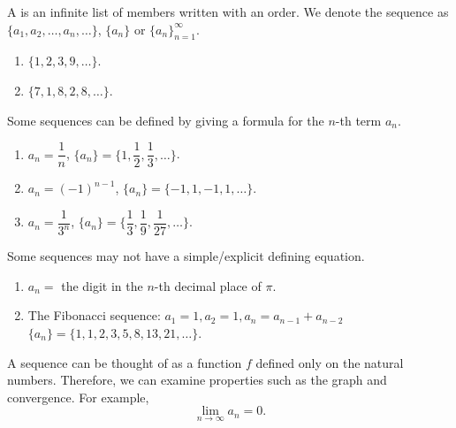 \begin{defn}
     A  is an infinite list of members written with an order. We denote the sequence as $\{a_1, a_2, \ldots, a_n, \ldots\}$, $\{a_n\}$ or $\{a_n\}_{n=1}^\infty$.
\end{defn}

\begin{ex}[sequences]\leavevmode
\begin{enumerate}
    \item $\{1, 2, 3, 9, \ldots\}$.
    \item $\{7, 1, 8, 2, 8, \ldots\}$.
\end{enumerate}
\end{ex}

Some sequences can be defined by giving a formula for the $n$-th term $a_n$.

\begin{ex}\leavevmode
\begin{enumerate}
    \item $a_n = \dfrac{1}{n}$, $\{a_n\} = \{1, \dfrac{1}{2}, \dfrac{1}{3}, \ldots\}$.
    \item $a_n = (-1)^{n-1}$, $\{a_n\} = \{-1, 1, -1, 1, \ldots\}$.
    \item $a_n = \dfrac{1}{3^n}$, $\{a_n\} = \{\dfrac{1}{3}, \dfrac{1}{9}, \dfrac{1}{27}, \ldots\}$.
\end{enumerate}
\end{ex}


Some sequences may not have a simple/explicit defining equation.

\begin{ex} \leavevmode
\begin{enumerate}
    \item $a_n = $ the digit in the $n$-th decimal place of $\pi$.
    \item The Fibonacci sequence: $a_1 = 1, a_2 = 1, a_n = a_{n-1} + a_{n-2}$ \\
    $\{a_n\} = \{1, 1, 2, 3, 5, 8, 13, 21, \ldots\}$. 
\end{enumerate}
\end{ex}


\begin{rmk}
    A sequence can be thought of as a function $f$ defined only on the natural numbers. Therefore, we can examine properties such as the graph and convergence. For example, \[ \lim_{n \to \infty} a_n = 0. \]
\end{rmk}

